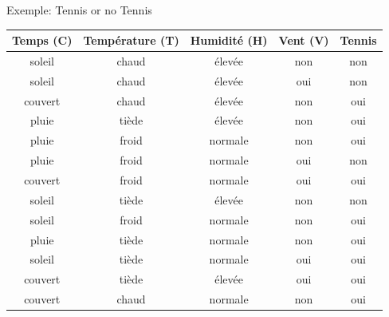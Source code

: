 \documentclass[8pt]{beamer}
\begin{document}
			\begin{frame}{Exemple: Tennis or no Tennis}
				\begin{table}[H]
					\begin{center}
						\begin{tabular}{c c c c c}
							\toprule
							Temps (C) & Température (T) & Humidité (H) & Vent (V) & Tennis\\
							\midrule
							soleil & chaud & élevée & non & non\\
							soleil & chaud & élevée & oui & non\\
							couvert & chaud & élevée & non & oui\\
							pluie & tiède & élevée & non & oui\\
							pluie & froid & normale & non & oui\\
							pluie & froid & normale & oui & non\\
							couvert & froid & normale & oui & oui\\
							soleil & tiède & élevée & non & non\\
							soleil & froid & normale & non & oui\\
							pluie & tiède & normale & non & oui\\
							soleil & tiède & normale & oui & oui\\
							couvert & tiède & élevée & oui & oui\\
							couvert & chaud & normale & non & oui\\
							\bottomrule
						\end{tabular}
					\end{center}
				\end{table}
			\end{frame}
\end{document}

